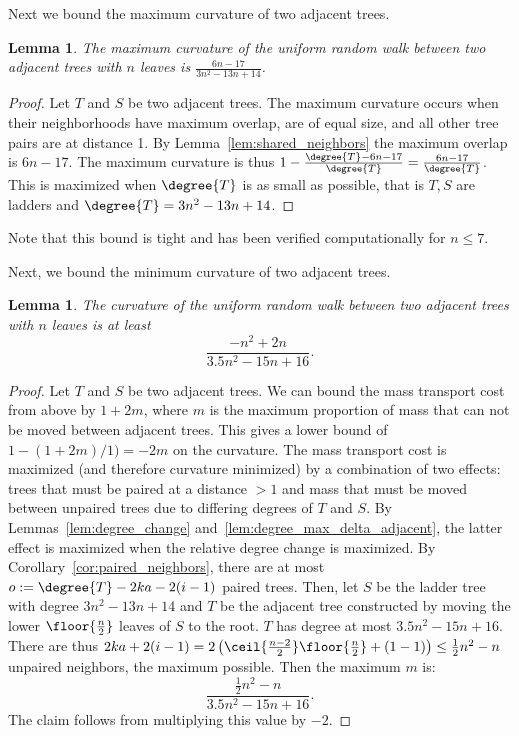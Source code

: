 \documentclass{amsart}
\newtheorem{lemma}[theorem]{Lemma}
\begin{document}
Next we bound the maximum curvature of two adjacent trees.

\begin{lemma}
	The maximum curvature of the uniform random walk between two adjacent trees with $n$ leaves is $\frac{6n-17}{3n^2-13n+14}$. 
\end{lemma}
\begin{proof}
Let $T$ and $S$ be two adjacent trees.
The maximum curvature occurs when their neighborhoods have maximum overlap, are of equal size, and all other tree pairs are at distance 1.
By Lemma~\ref{lem:shared_neighbors} the maximum overlap is $6n-17$.
The maximum curvature is thus $1 - \frac{\degree{T} - 6n-17}{\degree{T}} = \frac{6n - 17}{\degree{T}}$. This is maximized when $\degree{T}$ is as small as possible, that is $T,S$ are ladders and $\degree{T} = 3n^2 - 13n + 14$.
\end{proof}

Note that this bound is tight and has been verified computationally for $n \le 7$.

Next, we bound the minimum curvature of two adjacent trees.

\begin{lemma}
	The curvature of the uniform random walk between two adjacent trees with $n$ leaves is at least
	$$\frac{-n^2 + 2n}{3.5n^2 - 15n + 16}.$$
\end{lemma}
\begin{proof}
	Let $T$ and $S$ be two adjacent trees.
	We can bound the mass transport cost from above by $1 + 2m$, where $m$ is the maximum proportion of mass that can not be moved between adjacent trees. 
	This gives a lower bound of $1 - (1 + 2m) / 1) = -2m$ on the curvature.
	The mass transport cost is maximized (and therefore curvature minimized) by a combination of two effects: trees that must be paired at a distance $>1$ and mass that must be moved between unpaired trees due to differing degrees of $T$ and $S$.  
	By Lemmas~\ref{lem:degree_change} and~\ref{lem:degree_max_delta_adjacent}, the latter effect is maximized when the relative degree change is maximized.
	By Corollary~\ref{cor:paired_neighbors}, there are at most $o := \degree{T} -2ka - 2(i-1)$ paired trees.
	Then, let $S$ be the ladder tree with degree $3n^2 - 13n + 14$ and $T$ be the adjacent tree constructed by moving the lower $\floor{\frac{n}{2}}$ leaves of $S$ to the root.
	$T$ has degree at most $3.5n^2 -15n + 16$.
	There are thus $2ka + 2(i-1) = 2\left(\ceil{\frac{n-2}{2}}\floor{\frac{n}{2}} +(1-1)\right) \le \frac{1}{2}n^2 - n$ unpaired neighbors, the maximum possible.
	Then the maximum $m$ is:
	$$\frac{\frac{1}{2}n^2 - n}{3.5n^2 - 15n + 16}.$$
	The claim follows from multiplying this value by $-2$.
\end{proof}
\end{document}
